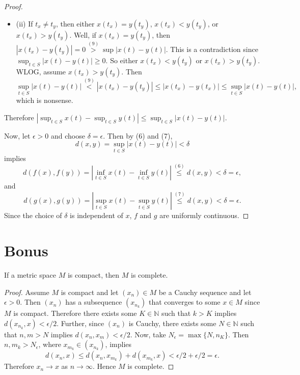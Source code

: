 \documentclass[11pt]{article}
\begin{document}
\begin{itemize}[label={},leftmargin=4mm, itemsep=1em, parsep=1em]
\begin{proof}
\begin{itemize}[label={},leftmargin=4mm, itemsep=1em, parsep=1em]
      \item (ii) If $t_{x} \neq t_{y}$, then either $x(t_{x}) = y(t_{y})$,
        $x(t_{x}) < y(t_{y})$, or $x(t_{x}) > y(t_{y})$. Well, if $x(t_{x}) =
        y(t_{y})$, then $|x(t_{x}) - y(t_{y})| = 0 \stackrel{(9)}{>} \sup|x(t) -
        y(t)|$. This is a contradiction since $\sup_{t\in S}|x(t) - y(t)| \geq
        0$. So either $x(t_{x}) < y(t_{y})$ or $x(t_{x}) > y(t_{y})$. WLOG,
        assume $x(t_{x}) > y(t_{y})$. Then 
        \[ \sup_{t\in S}|x(t) - y(t)| \stackrel{(9)}{<} |x(t_{x}) - y(t_{y})|
        \leq |x(t_{x}) - y(t_{x})| \leq \sup_{t\in S}|x(t) - y(t)|, \]
        which is nonsense.
    \end{itemize}
    Therefore $|\sup_{t\in S}x(t) - \sup_{t\in S}y(t)| \leq \sup_{t\in S}|x(t) -
    y(t)|$.

    Now, let $\epsilon > 0$ and choose $\delta = \epsilon$. Then by (6) and (7),
    \[ d(x,y) = \sup_{t\in S}|x(t) - y(t)| < \delta \]
    implies 
    \[ d(f(x), f(y)) = |\inf_{t\in S}x(t) - \inf_{t\in S}y(t)|
      \stackrel{(6)}{\leq} d(x,y) < \delta = \epsilon, \]
    and 
    \[ d(g(x), g(y)) = |\sup_{t\in S}x(t) - \sup_{t\in S}y(t)|
    \stackrel{(7)}{\leq} d(x,y) < \delta = \epsilon. \]
    Since the choice of $\delta$ is independent of $x$, $f$ and $g$ are
    uniformly continuous.
  \end{proof}
\end{itemize}

\section*{Bonus}

\begin{Proposition}
  If a metric space $M$ is compact, then $M$ is complete.
\end{Proposition}

\begin{proof}
  Assume $M$ is compact and let $(x_{n}) \in M$ be a Cauchy sequence and let
  $\epsilon > 0$. Then
  $(x_{n})$ has a subsequence $(x_{n_{k}})$ that converges to some $x\in M$
  since $M$ is compact. Therefore there exists some $K \in \mathbb{N}$ such that
  $k > K$ implies $d(x_{n_{k}}, x) < \epsilon / 2$. Further, since $(x_{n})$ is Cauchy,
  there exists some $N \in \mathbb{N}$ such that $n,m > N$ implies $d(x_{n},
  x_{m}) < \epsilon / 2$. Now, take $N_{\epsilon} = \max\{N, n_{K}\}$. Then $n,
  m_{k} > N_{\epsilon}$, where $x_{m_{k}} \in (x_{n_{k}})$, implies 
  \[ d(x_{n}, x) \leq d(x_{n}, x_{m_{k}}) + d(x_{m_{k}}, x) < \epsilon / 2 +
  \epsilon / 2 = \epsilon. \]
  Therefore $x_{n}\rightarrow x$ as $n \rightarrow \infty$. Hence $M$ is complete.
\end{proof}
\end{document}
